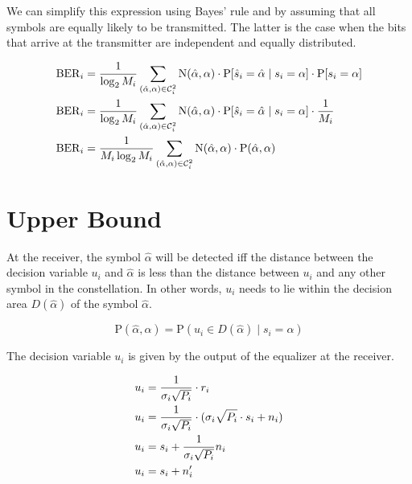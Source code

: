 \documentclass[a4paper,12pt]{article}
\begin{document}
\noindent We can simplify this expression using Bayes' rule and by assuming that all symbols are equally likely to be transmitted. The latter is the case when the bits that arrive at the transmitter are independent and equally distributed.

\begin{align}
    \mathrm{BER}_i &= \frac{1}{\log_2{M_i}} \sum_{(\hat{\alpha}, \alpha) \in \mathcal{C}^{2}_i} \mathrm{N}(\hat{\alpha}, \alpha) \cdot \mathrm{P}[\hat{s}_i = \hat{\alpha} \mid s_i = \alpha] \cdot \mathrm{P}[s_i = \alpha] \notag \\
    \mathrm{BER}_i &= \frac{1}{\log_2{M_i}} \sum_{(\hat{\alpha}, \alpha) \in \mathcal{C}^{2}_i} \mathrm{N}(\hat{\alpha}, \alpha) \cdot \mathrm{P}[\hat{s}_i = \hat{\alpha} \mid s_i = \alpha] \cdot \frac{1}{M_i} \notag \\
    \mathrm{BER}_i &= \frac{1}{M_i \log_2{M_i}} \sum_{(\hat{\alpha}, \alpha) \in \mathcal{C}^{2}_i} \mathrm{N}(\hat{\alpha}, \alpha) \cdot \mathrm{P}(\hat{\alpha}, \alpha) \label{eq:BERi-derivation}
\end{align}
\bigskip


\section{Upper Bound}

At the receiver, the symbol $ \hat{\alpha} $ will be detected iff the distance between the decision variable $ u_i $ and $ \hat{\alpha} $ is less than the distance between $ u_i $ and any other symbol in the constellation. In other words, $ u_i $ needs to lie within the decision area $ D(\hat{\alpha}) $ of the symbol $ \hat{\alpha} $.

\begin{equation}
    \mathrm{P}(\hat{\alpha}, \alpha) = \mathrm{P}(u_i \in D(\hat{\alpha}) \mid s_i = \alpha) \label{eq:decision-probability}
\end{equation}

\medskip
\noindent The decision variable $ u_i $ is given by the output of the equalizer at the receiver.

\begin{align}
    u_i &= \frac{1}{\sigma_i \sqrt{P_i}} \cdot r_i  \notag \\
    u_i &= \frac{1}{\sigma_i \sqrt{P_i}} \cdot (\sigma_i \sqrt{P_i} \cdot s_i + n_i)  \notag \\
    u_i &= s_i + \frac{1}{\sigma_i \sqrt{P_i}} n_i  \notag \\
    u_i &= s_i + n'_i \label{eq:decision-variable}
\end{align}
\end{document}
